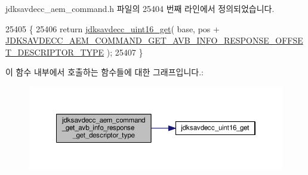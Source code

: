 jdksavdecc\+\_\+aem\+\_\+command.\+h 파일의 25404 번째 라인에서 정의되었습니다.


\begin{DoxyCode}
25405 \{
25406     \textcolor{keywordflow}{return} \hyperlink{group__endian_ga3fbbbc20be954aa61e039872965b0dc9}{jdksavdecc\_uint16\_get}( base, pos + 
      \hyperlink{group__command__get__avb__info__response_ga1d48d08cf3954e6c32c63d30b4323a03}{JDKSAVDECC\_AEM\_COMMAND\_GET\_AVB\_INFO\_RESPONSE\_OFFSET\_DESCRIPTOR\_TYPE}
       );
25407 \}
\end{DoxyCode}


이 함수 내부에서 호출하는 함수들에 대한 그래프입니다.\+:
\nopagebreak
\begin{figure}[H]
\begin{center}
\leavevmode
\includegraphics[width=350pt]{group__command__get__avb__info__response_gad2031024e97206470bccff99b206804f_cgraph}
\end{center}
\end{figure}




